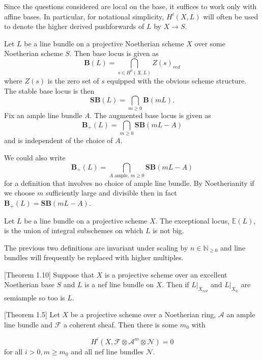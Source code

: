 \documentclass[a4paper,12pt]{book}
\newcommand{\A}{\mathcal{A}}
\newcommand{\F}{\mathcal{F}}
\newcommand{\SB}{\mathbf{SB}}
\newcommand{\BB}{\mathbf{B}}
\newcommand{\BS}{\mathbf{B}_{+}}
\begin{document}
Since the questions considered are local on the base, it suffices to work only with affine bases. In particular, for notational simplicity, $H^{i}(X,L)$ will often be used to denote the higher derived pushforwards of $L$ by $X \to S$. 
	
\begin{definition}
	Let $L$ be a line bundle on a projective Noetherian scheme $X$ over some Noetherian scheme $S$. Then base locus is given as 
	$$\BB(L)= \bigcap_{s \in H^{0}(X,L)} Z(s)_{red}$$
	where $Z(s)$ is the zero set of $s$ equipped with the obvious scheme structure. The stable base locus is then
	$$\SB(L)=\bigcap_{m \geq 0}\BB(mL).$$
	Fix an ample line bundle $A$. The augmented base locus is given as 
	$$\BS(L)=\bigcap_{m \geq 0}\SB(mL-A)$$
	and is independent of the choice of $A$.
	
\end{definition}

We could also write \[\BS(L)= \bigcap_{A \text{ ample, } m \geq 0}\SB(mL-A)\] for a definition that involves no choice of ample line bundle. By Noetherianity if we choose $m$ sufficiently large and divisible then in fact $\BS(L)=\SB(mL-A)$.

 \begin{definition}
	Let $L$ be a line bundle on a projective scheme $X$. The exceptional locus, $\mathbb{E}(L)$, is the union of integral subschemes on which $L$ is not big.
\end{definition}

The previous two definitions are invariant under scaling by $n \in \mathbb{N}_{\geq 0}$ and line bundles will frequently be replaced with higher multiples.

\begin{theorem}\cite{witaszek2020keel}[Theorem 1.10]\label{red}
	Suppose that $X$ is a projective scheme over an excellent Noetherian base $S$ and $L$ is a nef line bundle on $X$. Then if $L|_{X_{red}}$ and $L|_{X_{\mathbb{Q}}}$ are semiample so too is $L$.
\end{theorem}


\begin{theorem}\cite{keeler2003ample}[Theorem 1.5]\label{{Keeler}}
	Let $X$ be a projective scheme over a Noetherian ring, $\A$ an ample line bundle and $\F$ a coherent sheaf. Then there is some $m_{0}$ with 
	
	\[H^{i}(X, \F \otimes \A^{m} \otimes \mathcal{N})=0\]
	for all $i>0, m \geq m_{0}$ and all nef line bundles $\mathcal{N}$.
\end{theorem}
\end{document}
